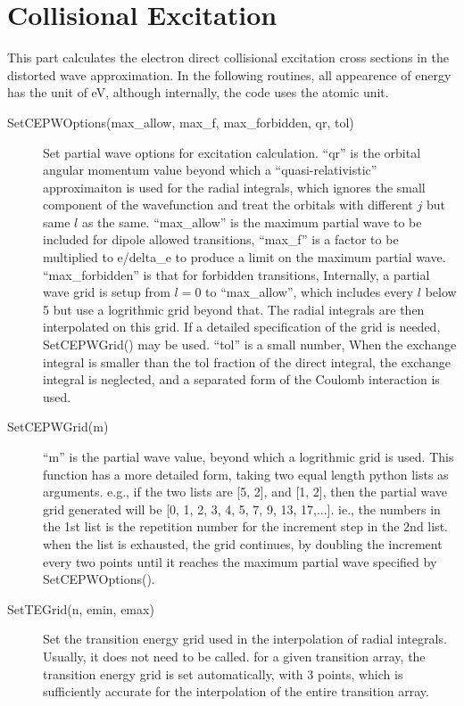 \documentclass[12pt]{article}
\begin{document}
\section{Collisional Excitation}
This part calculates the electron direct collisional excitation cross
sections in the distorted wave approximation. In the following routines, all
appearence of energy has the unit of eV, although internally, the code uses
the atomic unit.

\begin{description}
\item[SetCEPWOptions(max\_allow, max\_f, max\_forbidden, qr, tol)] 
Set partial wave options for excitation calculation. ``qr'' is the orbital
angular momentum value beyond which a ``quasi-relativistic'' approximaiton
is used for the radial integrals, which ignores the small component of the
wavefunction and treat the orbitals with different $j$ but same $l$ as the
same. ``max\_allow'' is the maximum partial wave to be included for dipole
allowed transitions, 
``max\_f'' is a factor to be multiplied to e/delta\_e to produce a limit on the
maximum partial wave. ``max\_forbidden'' is that for forbidden transitions,
Internally, a partial wave grid is setup from $l = 0$ to 
``max\_allow'', which includes every $l$ below 5 but use a logrithmic grid
beyond 
that. The radial integrals are then interpolated on this grid. If
a detailed specification of the grid is needed, SetCEPWGrid() may be used.
``tol'' is a small number, When the exchange integral is smaller than the
tol fraction of the direct integral, the exchange integral is neglected, and a
separated form of the Coulomb interaction is used. 

\item[SetCEPWGrid(m)] 
``m'' is the partial wave value, beyond which a logrithmic
grid is used. This function has a more detailed form, taking two equal length
python lists as arguments. e.g., if the two lists are [5, 2], and [1, 2], then
the partial wave grid generated will be [0, 1, 2, 3, 4, 5, 7, 9, 13, 17,...].
ie., the numbers in the 1st list is the repetition number for the increment
step in the 2nd list. when the list is exhausted, the grid continues, by
doubling the increment every two points until it reaches the maximum partial
wave specified by SetCEPWOptions().

\item[SetTEGrid(n, emin, emax)] 
Set the transition energy grid used in the
interpolation of radial integrals. Usually, it does not need to be
called. for a given transition array, the transition energy grid is set
automatically, with 3 points, which is sufficiently accurate for the
interpolation of the entire transition array. 


\end{description}
\end{document}
